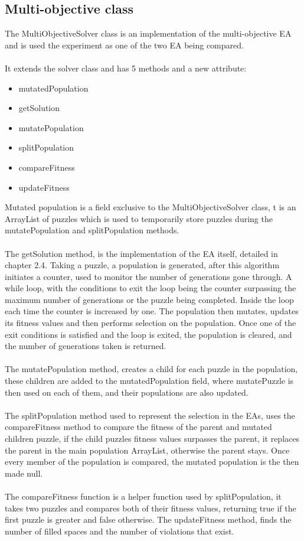 \documentclass[a4paper,11pt]{article}
\begin{document}
\subsection{Multi-objective class}
The MultiObjectiveSolver class is an implementation of the multi-objective EA and  is used the experiment as one of the two EA being compared.\\\\ It extends the solver class and has 5 methods and a new attribute:
\begin{itemize}
\item mutatedPopulation
\item getSolution
\item mutatePopulation
\item splitPopulation
\item compareFitness
\item updateFitness
\end{itemize}

Mutated population is a field exclusive to the MultiObjectiveSolver class, t is an ArrayList of puzzles which is used to temporarily store puzzles during the mutatePopulation and splitPopulation methods.\\\\ The getSolution method, is the implementation of the EA itself, detailed in chapter 2.4. Taking a puzzle, a population is generated, after this algorithm initiates a counter, used to monitor the number of generations gone through. A while loop, with the conditions to exit the loop being the counter surpassing the maximum number of generations or the puzzle being completed. Inside the loop each time the counter is increased by one. The population then mutates, updates its fitness values and then performs selection on the population. Once one of the exit conditions is satisfied and the loop is exited, the population is cleared, and the number of generations taken is returned. \\\\ The mutatePopulation method, creates a child for each puzzle in the population, these children are added to the mutatedPopulation field, where mutatePuzzle is then used on each of them, and their populations are also updated.\\\\ The splitPopulation method used to represent the selection in the EAs, uses the compareFitness method to compare the fitness of the parent and mutated children puzzle, if the child puzzles fitness values surpasses the parent, it replaces the parent in the main population ArrayList, otherwise the parent stays. Once every member of the population is compared, the mutated population is the then made null.\\\\ The compareFitness function is a helper function used by splitPopulation, it takes two puzzles and compares both of their fitness values, returning true if the first puzzle is greater and false otherwise. The updateFitness method, finds the number of filled spaces and the number of violations that exist.  
\end{document}
